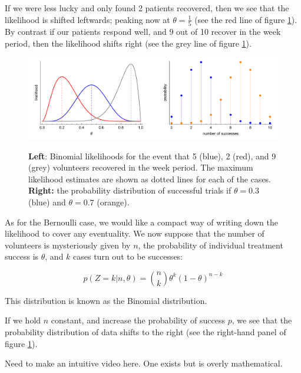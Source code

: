 \documentclass[11pt,fullpage]{book}
\begin{document}
If we were less lucky and only found 2 patients recovered, then we see that the likelihood is shifted leftwards; peaking now at $\theta=\frac{1}{5}$ (see the red line of figure \ref{fig:Distributions_binomialClinicalTrial}). By contrast if our patients respond well, and 9 out of 10 recover in the week period, then the likelihood shifts right (see the grey line of figure \ref{fig:Distributions_binomialClinicalTrial}).

\begin{figure}
\centering
\scalebox{0.5} 
{\includegraphics{Distributions_binomialClinicalTrial.pdf}}
\caption{\textbf{Left}: Binomial likelihoods for the event that 5 (blue), 2 (red), and 9 (grey) volunteers recovered in the week period. The maximum likelihood estimates are shown as dotted lines for each of the cases. \textbf{Right:} the probability distribution of successful trials if $\theta=0.3$ (blue) and $\theta=0.7$ (orange).}\label{fig:Distributions_binomialClinicalTrial}
\end{figure}

As for the Bernoulli case, we would like a compact way of writing down the likelihood to cover any eventuality. We now suppose that the number of volunteers is mysteriously given by $n$, the probability of individual treatment success is $\theta$, and $k$ cases turn out to be successes:

\begin{equation}\label{eq:Distributions_binomialDef}
p(Z=k|n,\theta) = {n \choose k} \theta^{k} (1-\theta)^{n-k}
\end{equation}

This distribution is known as the Binomial distribution.

If we hold $n$ constant, and increase the probability of success $p$, we see that the probability distribution of data shifts to the right (see the right-hand panel of figure \ref{fig:Distributions_binomialClinicalTrial}).

 Need to make an intuitive video here. One exists but is overly mathematical.
\end{document}

